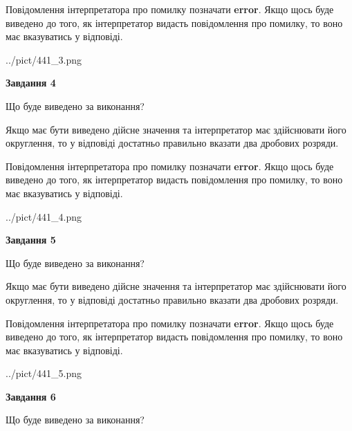 \documentclass[12pt, ukrainian]{article}
\begin{document}
{\begin {Large}
Повідомлення інтерпретатора про помилку позначати \textbf{error}.
Якщо щось буде виведено до того, як інтерпретатор видасть повідомлення про помилку, 
то воно має вказуватись у відповіді. \par

\begin{center}
	{../pict/441_3.png}
\end{center}
\newpage

{\begin {center}\textbf{Завдання 4}\end {center}}\par
Що буде виведено за виконання? \par

Якщо має бути виведено дійсне значення та інтерпретатор має здійснювати його округлення, 
то у відповіді достатньо правильно вказати два дробових розряди.

Повідомлення інтерпретатора про помилку позначати \textbf{error}.
Якщо щось буде виведено до того, як інтерпретатор видасть повідомлення про помилку, 
то воно має вказуватись у відповіді. \par

\begin{center}
	{../pict/441_4.png}
\end{center}
\newpage

{\begin {center}\textbf{Завдання 5}\end {center}}\par
Що буде виведено за виконання? \par

Якщо має бути виведено дійсне значення та інтерпретатор має здійснювати його округлення, 
то у відповіді достатньо правильно вказати два дробових розряди.

Повідомлення інтерпретатора про помилку позначати \textbf{error}.
Якщо щось буде виведено до того, як інтерпретатор видасть повідомлення про помилку, 
то воно має вказуватись у відповіді. \par

\begin{center}
	{../pict/441_5.png}
\end{center}
\newpage

{\begin {center}\textbf{Завдання 6}\end {center}}\par
Що буде виведено за виконання? \par


\end{Large}}
\end{document}
